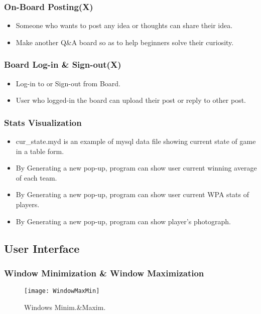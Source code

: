 \documentclass[conference,compsoc, twocolumn]{IEEEtran}
\begin{document}
\subsubsection{On-Board Posting(X)}
\begin{itemize}
\item Someone who wants to post any idea or thoughts can share their idea.
\item Make another Q&A board so as to help beginners solve their curiosity.
\end{itemize}

\subsubsection{Board Log-in & Sign-out(X)}
\begin{itemize}
\item Log-in to or Sign-out from Board.
\item User who logged-in the board can upload their post or reply to other post.
\end{itemize}

\subsubsection{Stats Visualization}
\begin{itemize}
\item cur\_state.myd is an example of mysql data file showing current state of game in a table form.
\item By Generating a new pop-up, program can show user current winning average of each team.
\item By Generating a new pop-up, program can show user current WPA stats of players.
\item By Generating a new pop-up, program can show player's photograph.
\end{itemize}



\subsection{User Interface}


\subsubsection{Window Minimization & Window Maximization}
\begin{figure}[h]
\centering\texttt{[image: WindowMaxMin]}
\caption{Windows Minim.\&Maxim.}
\end{figure}
\end{document}
